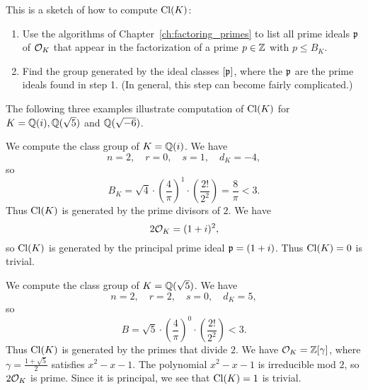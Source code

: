 This is a sketch of how to compute $\operatorname{Cl}(K)$:
\begin{enumerate}
\item Use the algorithms of Chapter~\ref{ch:factoring_primes} to list all
prime ideals $\mathfrak{p}$ of $\mathcal{O}_K$ that appear in the factorization
of a prime $p\in \mathbb{Z}$ with $p\leq B_K$.
\item Find the group generated  by the ideal
classes $[\mathfrak{p}]$, where the $\mathfrak{p}$ are the prime ideals
found in step 1.  (In general, this step can become
fairly complicated.)
\end{enumerate}
The following three examples illustrate computation of $\operatorname{Cl}(K)$
for $K=\mathbb{Q}(i), \mathbb{Q}(\sqrt{5})$ and $\mathbb{Q}(\sqrt{-6})$.
\begin{example}
We compute the class group of $K=\mathbb{Q}(i)$.  We have
$$
  n = 2, \quad r=0, \quad s=1, \quad d_K = -4,
$$
so 
$$ 
  B_K = \sqrt{4}\cdot \left(\frac{4}{\pi}\right)^1
   \cdot\left(\frac{2!}{2^2}\right) = \frac{8}{\pi} <3.
$$
Thus $\operatorname{Cl}(K)$ is generated by the prime divisors
of $2$.  We have
$$
 2\mathcal{O}_K = (1+i)^2,
$$
so $\operatorname{Cl}(K)$ is generated by the principal prime
ideal $\mathfrak{p}=(1+i)$. Thus $\operatorname{Cl}(K)=0$ is trivial.
\end{example}

\begin{example}
We compute the class group of $K=\mathbb{Q}(\sqrt{5})$.
We have
$$
  n = 2, \quad r = 2, \quad s=0, \quad d_K = 5,
$$
so $$B = \sqrt{5}\cdot \left(\frac{4}{\pi}\right)^0\cdot 
\left(\frac{2!}{2^2}\right)  < 3.$$
Thus $\operatorname{Cl}(K)$ is generated by the primes that divide $2$.
We have $\mathcal{O}_K=\mathbb{Z}[\gamma]$, where $\gamma=\frac{1+\sqrt{5}}{2}$
satisfies $x^2-x-1$.   The polynomial $x^2-x-1$ is irreducible
mod $2$, so $2\mathcal{O}_K$ is prime.  Since it is principal, we see
that $\operatorname{Cl}(K)=1$ is trivial.
\end{example}

